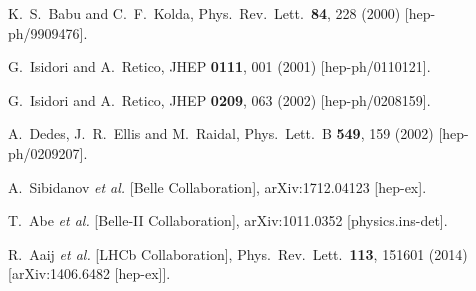 \documentclass[prd,preprint,superscriptaddress,amsmath,amssymb]{revtex4}
\begin{document}
\begin{thebibliography}{100}
  K.~S.~Babu and C.~F.~Kolda,
  Phys.\ Rev.\ Lett.\  {\bf 84}, 228 (2000)
  [hep-ph/9909476].

  G.~Isidori and A.~Retico,
  JHEP {\bf 0111}, 001 (2001)
  [hep-ph/0110121].

  G.~Isidori and A.~Retico,
  JHEP {\bf 0209}, 063 (2002)
  [hep-ph/0208159].
  
  A.~Dedes, J.~R.~Ellis and M.~Raidal,
  Phys.\ Lett.\ B {\bf 549}, 159 (2002)
  [hep-ph/0209207].
  

  A.~Sibidanov {\it et al.} [Belle Collaboration],
  arXiv:1712.04123 [hep-ex].

  T.~Abe {\it et al.} [Belle-II Collaboration],
  arXiv:1011.0352 [physics.ins-det].


  R.~Aaij {\it et al.} [LHCb Collaboration],
  Phys.\ Rev.\ Lett.\  {\bf 113}, 151601 (2014)
  [arXiv:1406.6482 [hep-ex]].


\end{thebibliography}
\end{document}
